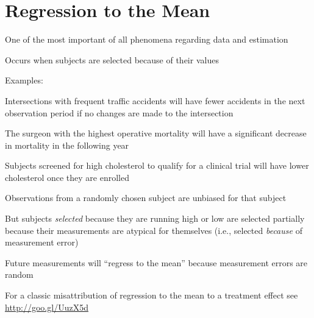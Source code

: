 \section{Regression to the Mean}\label{sec:change-rttm}
\bi
\item One of the most important of all phenomena regarding data and estimation
\item Occurs when subjects are selected because of their values
\item Examples:
 \be
 \item Intersections with frequent traffic accidents will have fewer accidents in the next observation
  period if no changes are made to the intersection
 \item The surgeon with the highest operative mortality will have a
   significant decrease in mortality in the following year
 \item Subjects screened for high cholesterol to qualify for a clinical trial will have lower
  cholesterol once they are enrolled
 \ee
\item Observations from a randomly chosen subject are unbiased for that subject
\item But subjects \emph{selected} because they are running high or low are selected partially because
  their measurements are atypical for themselves (i.e., selected \emph{because} of measurement error)
\item Future measurements will ``regress to the mean'' because measurement errors are random
\item For a classic misattribution of regression to the mean to a
  treatment effect see\\ \url{http://goo.gl/UuzX5d}
\ei

